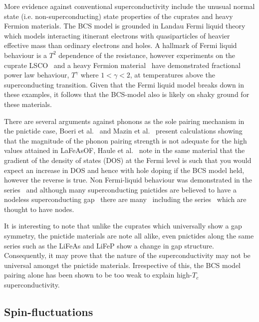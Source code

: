 More evidence against conventional superconductivity include the unusual normal state (i.e. non-superconducting) state properties of the cuprates and heavy Fermion materials. The \ac{BCS} model is grounded in Landau Fermi liquid theory which models interacting itinerant electrons with quasiparticles of heavier effective mass than ordinary electrons and holes. A hallmark of Fermi liquid behaviour is a $T^2$ dependence of the resistance, however experiments on the cuprate \ac{LSCO}~\cite{Cooper2009} and a heavy Fermion material~\cite{Custers2003} have demonstrated fractional power law behaviour, $T^\gamma$ where $1 < \gamma < 2$, at temperatures above the superconducting transition. Given that the Fermi liquid model breaks down in these examples, it follows that the \ac{BCS}-model also is likely on shaky ground for these materials.

There are several arguments against phonons as the sole pairing mechanism in the pnictide case, Boeri et al.~\cite{Boeri2008} and Mazin et al.~\cite{Mazin2008} present calculations showing that the magnitude of the phonon pairing strength is not adequate for the high \Tc values attained in LaFeAsOF, Haule et al.~\cite{Haule2008} note in the same material that the gradient of the density of states (DOS) at the Fermi level is such that you would expect an increase in DOS and hence \Tc with hole doping if the \ac{BCS} model held, however the reverse is true. Non Fermi-liquid behaviour was demonstrated in the \BaFePAs series~\cite{Jiang2009,Kasahara2010} and although many superconducting pnictides are believed to have a nodeless superconducting gap~\cite{Hashimoto2012,Zhang2011a,Ding2008, Terashima2009} there are many~\cite{Fletcher2009, Qiu2011b, Song2011, Dong2010, Hashimoto2012} including the \BaFePAs series~\cite{Zhang2011,Yamashita2011a,Suzuki2011} which are thought to have nodes.

It is interesting to note that unlike the cuprates which universally show a \DxTwoyTwo gap symmetry, the pnictide materials are note all alike, even pnictides along the same series such as the LiFeAs and LiFeP show a change in gap structure. Consequently, it may prove that the nature of the superconductivity may not be universal amongst the pnictide materials. Irrespective of this, the \ac{BCS} model pairing alone has been shown to be too weak to explain high-$T_c$ superconductivity.


\subsection{Spin-fluctuations}

